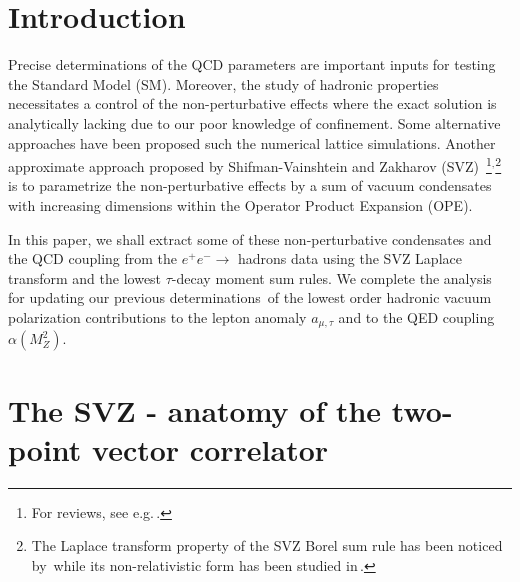 \documentclass[review]{elsarticle}
\def\nin{\noindent}
\begin{document}
\newpage
\section{Introduction}
\vspace*{-0.2cm}
Precise determinations of the QCD parameters are important inputs for testing the Standard Model (SM). Moreover, 
the study of hadronic properties necessitates a control of the non-perturbative effects where the exact solution is analytically lacking due to our poor knowledge of confinement. Some alternative approaches have been proposed such the numerical lattice simulations. Another approximate approach proposed by Shifman-Vainshtein and Zakharov (SVZ)\,\,\cite{SVZa}\,\footnote{For reviews, see e.g.\,\cite{ZAKA,SNB1,SNB2,SNREV1,SNREV2,SNB3,RRY,DERAF,BERTa,YNDB,PASC,DOSCH,COL}.}$^,$\footnote{The Laplace transform property of the SVZ Borel sum rule has been noticed by\,\cite{SNR} while its non-relativistic form has been studied in\,\cite{BELLa}. }  is to parametrize the non-perturbative effects by a sum of vacuum condensates with increasing dimensions within the Operator Product Expansion (OPE). 

In this paper, we shall extract some of these non-perturbative condensates and the QCD coupling from the $e^+e^-\to$ hadrons data using the SVZ Laplace transform and the lowest $\tau$-decay moment sum rules.  We complete the analysis for updating our previous determinations\,\cite{CALMET,SN76,SN78,SNamu,SNalfa} of the lowest order hadronic vacuum polarization  contributions to the lepton anomaly  $a_{\mu,\tau}$ and to the QED coupling $\alpha(M_Z^2)$.

\section{The SVZ - anatomy of the two-point vector correlator}
\vspace*{-0.2cm}
\end{document}
